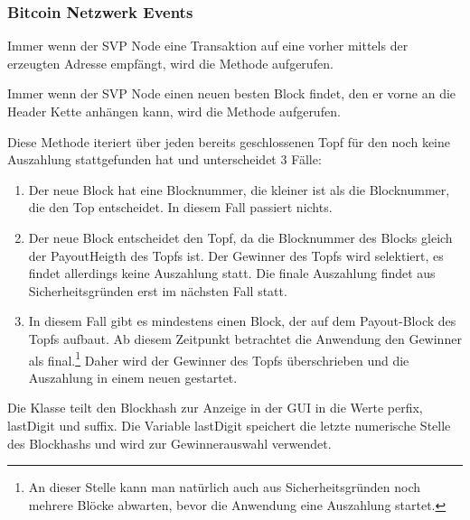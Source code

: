 \subsubsection{Bitcoin Netzwerk Events}

Immer wenn der SVP Node eine Transaktion auf eine vorher mittels der  erzeugten Adresse empfängt, wird die  Methode aufgerufen.




Immer wenn der SVP Node einen neuen besten Block findet, den er vorne an die Header Kette anhängen kann, wird die  Methode aufgerufen.


Diese Methode iteriert über jeden bereits geschlossenen Topf für den noch keine Auszahlung stattgefunden hat und unterscheidet 3 Fälle:
\begin{enumerate}
\item Der neue Block hat eine Blocknummer, die kleiner ist als die Blocknummer, die den Top entscheidet. In diesem Fall passiert nichts.
\item Der neue Block entscheidet den Topf, da die Blocknummer des Blocks gleich der PayoutHeigth des Topfs ist. Der Gewinner des Topfs wird selektiert, es findet allerdings keine Auszahlung statt. Die finale Auszahlung findet aus Sicherheitsgründen erst im nächsten Fall statt.
\item In diesem Fall gibt es mindestens einen Block, der auf dem Payout-Block des Topfs aufbaut. Ab diesem Zeitpunkt betrachtet die Anwendung den Gewinner als final.\footnote{An dieser Stelle kann man natürlich auch aus Sicherheitsgründen noch mehrere Blöcke abwarten, bevor die Anwendung eine Auszahlung startet.} Daher wird der Gewinner des Topfs überschrieben und die Auszahlung in einem neuen  gestartet.
\end{enumerate}

Die Klasse  teilt den Blockhash zur Anzeige in der GUI in die Werte perfix, lastDigit und suffix. Die Variable lastDigit speichert die letzte numerische Stelle des Blockhashs und wird zur Gewinnerauswahl verwendet.







